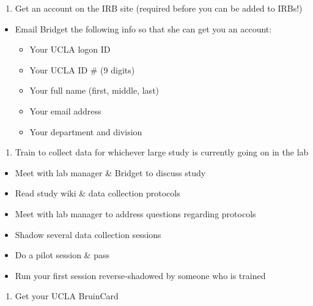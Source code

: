 \documentclass[]{book}
\providecommand{\tightlist}{%
  \setlength{\itemsep}{0pt}\setlength{\parskip}{0pt}}
\begin{document}
\begin{enumerate}
\def\labelenumi{\arabic{enumi}.}
\setcounter{enumi}{9}
\tightlist
\item
  Get an account on the IRB site (required before you can be added to
  IRBs!)
\end{enumerate}

\begin{itemize}
\tightlist
\item
  Email Bridget the following info so that she can get you an account:

  \begin{itemize}
  \tightlist
  \item
    Your UCLA logon ID
  \item
    Your UCLA ID \# (9 digits)
  \item
    Your full name (first, middle, last)
  \item
    Your email address
  \item
    Your department and division
  \end{itemize}
\end{itemize}

\begin{enumerate}
\def\labelenumi{\arabic{enumi}.}
\setcounter{enumi}{10}
\tightlist
\item
  Train to collect data for whichever large study is currently going on
  in the lab
\end{enumerate}

\begin{itemize}
\tightlist
\item
  Meet with lab manager \& Bridget to discuss study
\item
  Read study wiki \& data collection protocols
\item
  Meet with lab manager to address questions regarding protocols
\item
  Shadow several data collection sessions
\item
  Do a pilot session \& pass
\item
  Run your first session reverse-shadowed by someone who is trained
\end{itemize}

\begin{enumerate}
\def\labelenumi{\arabic{enumi}.}
\setcounter{enumi}{11}
\tightlist
\item
  Get your UCLA BruinCard
\end{enumerate}
\end{document}
